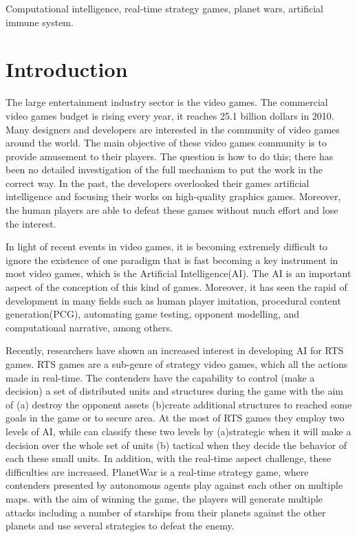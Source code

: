 \documentclass[conference]{IEEEtran}
\begin{document}
\begin{IEEEkeywords}
Computational intelligence, real-time strategy games, planet wars, artificial immune system.
\end{IEEEkeywords}

\section{Introduction}
The large entertainment industry sector is the video games. The commercial video games budget is rising every year, it reaches 25.1 billion dollars in 2010\cite{doc2}. Many designers and developers are interested in the community of video games around the world. The main objective of these video games community is to provide amusement to their players. The question is how to do this; there has been no detailed investigation of the full mechanism to put the work in the correct way\cite{doc5}.
In the past, the developers overlooked their games artificial intelligence and focusing their works on high-quality graphics games. Moreover, the human players are able to defeat these games without much effort and lose the interest\cite{doc5}.  

In light of recent events in video games, it is becoming extremely difficult to ignore the existence of one paradigm that is fast becoming a key instrument in most video games, which is the Artificial Intelligence(AI). The AI is an important aspect of the conception of this kind of games. Moreover, it has seen the rapid of development in many fields such as human player imitation, procedural content generation(PCG), automating game testing, opponent modelling, and computational narrative, among others\cite{doc5}.

Recently, researchers have shown an increased interest in developing AI for RTS games. RTS games are a sub-genre of strategy video games, which all the actions made in real-time. The contenders have the capability to control (make a decision) a set of distributed units and structures during the game with the aim of (a) destroy the opponent assets (b)create additional structures to reached some goals in the game or to secure area\cite{doc5,doc1,doc2,doc3,doc4}. At the most of RTS games they employ two levels of AI\cite{doc1}, while can classify these two levels by (a)strategic when it will make a decision over the whole set of units (b) tactical when they decide the behavior of each these small units. In addition, with the real-time aspect challenge, these difficulties are increased. PlanetWar is a real-time strategy game, where contenders presented by autonomous agents play against each other on multiple maps. with the aim of winning the game, the players will generate multiple attacks including a number of starships from their planets against the other planets and use several strategies to defeat the enemy.
\end{document}
